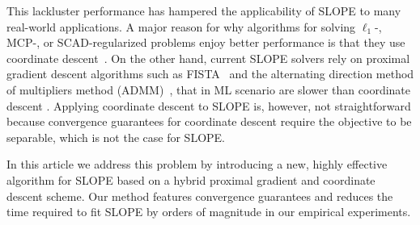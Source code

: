 This lackluster performance has hampered the applicability of SLOPE to many
real-world applications. %
A major reason for why algorithms for solving $\ell_1$-, MCP-, or SCAD-regularized problems enjoy better
performance is that they use coordinate
descent~\cite{tseng2001convergence,friedman2010,breheny2011}.
On the other hand, current SLOPE solvers rely on proximal gradient descent
algorithms such as FISTA~\cite{beck2009} and the
alternating direction method of multipliers method (ADMM)~\cite{boyd2010}, that in ML scenario are slower than coordinate descent \cite{moreau2022benchopt}.
Applying coordinate descent to SLOPE is, however, not straightforward
because convergence guarantees for coordinate descent require the
objective to be separable, which %
is not the case for SLOPE.


In this article we address this problem by introducing a new, highly effective
algorithm for SLOPE based on a hybrid proximal gradient and coordinate descent
scheme. Our method features convergence guarantees and reduces the time
required to fit SLOPE by orders of magnitude in our empirical experiments.
